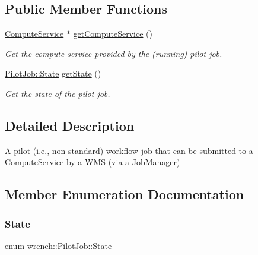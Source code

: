 \subsection*{Public Member Functions}
\begin{DoxyCompactItemize}
\item 
\hyperlink{classwrench_1_1_compute_service}{Compute\+Service} $\ast$ \hyperlink{classwrench_1_1_pilot_job_a296881f5e960313121e9cba4b89a1e9c}{get\+Compute\+Service} ()
\begin{DoxyCompactList}\small\item\em Get the compute service provided by the (running) pilot job. \end{DoxyCompactList}\item 
\hyperlink{classwrench_1_1_pilot_job_a0540139dbc8b0a8506a87b2f55020fc8}{Pilot\+Job\+::\+State} \hyperlink{classwrench_1_1_pilot_job_a3890ff3cb3b494270c7a635748c91d95}{get\+State} ()
\begin{DoxyCompactList}\small\item\em Get the state of the pilot job. \end{DoxyCompactList}\end{DoxyCompactItemize}


\subsection{Detailed Description}
A pilot (i.\+e., non-\/standard) workflow job that can be submitted to a \hyperlink{classwrench_1_1_compute_service}{Compute\+Service} by a \hyperlink{classwrench_1_1_w_m_s}{W\+MS} (via a \hyperlink{classwrench_1_1_job_manager}{Job\+Manager}) 

\subsection{Member Enumeration Documentation}
\mbox{\label{classwrench_1_1_pilot_job_a0540139dbc8b0a8506a87b2f55020fc8}} 
\subsubsection{\texorpdfstring{State}{State}}
{\footnotesize\ttfamily enum \hyperlink{classwrench_1_1_pilot_job_a0540139dbc8b0a8506a87b2f55020fc8}{wrench\+::\+Pilot\+Job\+::\+State}}



